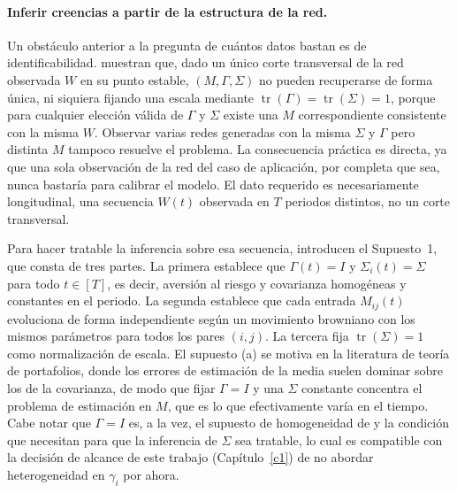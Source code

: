\paragraph{Inferir creencias a partir de la estructura de la red.}
Un obstáculo anterior a la pregunta de cuántos datos bastan es de identificabilidad.  muestran que, dado un único corte transversal de la red observada $W$ en su punto estable, $(M,\Gamma,\Sigma)$ no pueden recuperarse de forma única, ni siquiera fijando una escala mediante $\operatorname{tr}(\Gamma)=\operatorname{tr}(\Sigma)=1$, porque para cualquier elección válida de $\Gamma$ y $\Sigma$ existe una $M$ correspondiente consistente con la misma $W$. Observar varias redes generadas con la misma $\Sigma$ y $\Gamma$ pero distinta $M$ tampoco resuelve el problema. La consecuencia práctica es directa, ya que una sola observación de la red del caso de aplicación, por completa que sea, nunca bastaría para calibrar el modelo. El dato requerido es necesariamente longitudinal, una secuencia $W(t)$ observada en $T$ periodos distintos, no un corte transversal.

Para hacer tratable la inferencia sobre esa secuencia,  introducen el Supuesto~1, que consta de tres partes. La primera establece que $\Gamma(t)=I$ y $\Sigma_i(t)=\Sigma$ para todo $t\in[T]$, es decir, aversión al riesgo y covarianza homogéneas y constantes en el periodo. La segunda establece que cada entrada $M_{ij}(t)$ evoluciona de forma independiente según un movimiento browniano con los mismos parámetros para todos los pares $(i,j)$. La tercera fija $\operatorname{tr}(\Sigma)=1$ como normalización de escala. El supuesto (a) se motiva en la literatura de teoría de portafolios, donde los errores de estimación de la media suelen dominar sobre los de la covarianza, de modo que fijar $\Gamma=I$ y una $\Sigma$ constante concentra el problema de estimación en $M$, que es lo que efectivamente varía en el tiempo. Cabe notar que $\Gamma=I$ es, a la vez, el supuesto de homogeneidad de  y la condición que  necesitan para que la inferencia de $\Sigma$ sea tratable, lo cual es compatible con la decisión de alcance de este trabajo (Capítulo~\ref{c1}) de no abordar heterogeneidad en
$\gamma_i$ por ahora.

